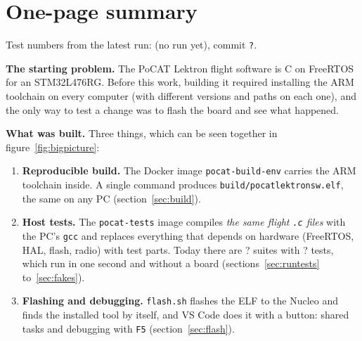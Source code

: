 \documentclass[11pt,a4paper]{article}
\DeclareRobustCommand{\_}{\textunderscore\allowbreak}
\newcommand{\cd}[1]{\texttt{#1}}
\def\TRdate{(no run yet)}\def\TRcommit{?}
\def\TRsuites{?}\def\TRsuitesGreen{?}\def\TRsuitesCrashed{0}
\def\TRtests{?}\def\TRpassed{?}\def\TRfailed{?}\def\TRignored{?}
\begin{document}
\section{One-page summary}\label{sec:resum}

\begin{center}

{\small Test numbers from the latest run: \TRdate{}, commit \cd{\TRcommit}.}
\end{center}

\textbf{The starting problem.} The PoCAT Lektron flight software is C on
FreeRTOS for an STM32L476RG. Before this work, building it required installing the
ARM toolchain on every computer (with different versions and paths on each one), and the only
way to test a change was to flash the board and see what happened.

\textbf{What was built.} Three things, which can be seen together in figure~\ref{fig:bigpicture}:
\begin{enumerate}
\item \textbf{Reproducible build.} The Docker image \cd{pocat-build-env} carries the
  ARM toolchain inside. A single command produces \cd{build/pocat\_lektron\_sw.elf}, the same on
  any PC (section~\ref{sec:build}).
\item \textbf{Host tests.} The \cd{pocat-tests} image compiles \emph{the same flight
  \cd{.c} files} with the PC's \cd{gcc} and replaces everything that depends on hardware
  (FreeRTOS, HAL, flash, radio) with test parts. Today there are \TRsuites{} suites with \TRtests{} tests,
  which run in one second and without a board (sections~\ref{sec:runtests} to~\ref{sec:fakes}).
\item \textbf{Flashing and debugging.} \cd{flash.sh} flashes the ELF to the Nucleo and finds the
  installed tool by itself, and VS Code does it with a button: shared tasks and debugging with
  \cd{F5} (section~\ref{sec:flash}).
\end{enumerate}
\end{document}
